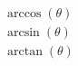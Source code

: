 \documentclass[a4paper, 10pt, final, garamond]{book}
\begin{document}
  \begin{gather*}
    \arccos(\theta)
    \\
    \arcsin(\theta)
    \\
    \arctan(\theta)
  \end{gather*}
\end{document}
